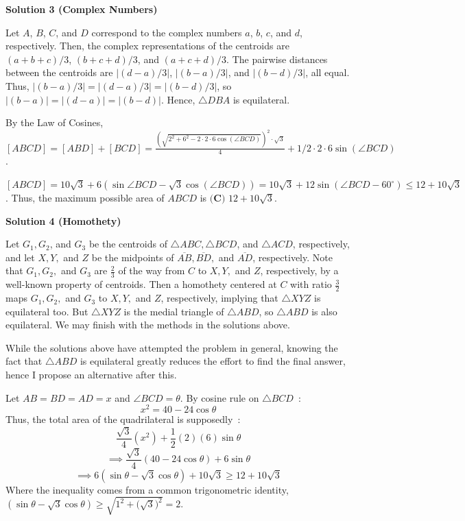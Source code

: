\begin{enumerate}
 



\textbf{Solution 3 (Complex Numbers)}

Let $A$, $B$, $C$, and $D$ correspond to the complex numbers $a$, $b$, $c$, and $d$, respectively. Then, the complex representations of the centroids are $(a+b+c)/3$, $(b+c+d)/3$, and $(a+c+d)/3$. The pairwise distances between the centroids are $\lvert (d-a)/3 \rvert$, $\lvert (b-a)/3 \rvert$, and $\lvert (b-d)/3 \rvert$, all equal. Thus, $\lvert (b-a)/3 \rvert=\lvert (d-a)/3 \rvert=\lvert (b-d)/3 \rvert$, so $\lvert (b-a) \rvert=\lvert (d-a) \rvert=\lvert (b-d) \rvert$. Hence, $\triangle DBA$ is equilateral.

 By the Law of Cosines,$[ABCD]=[ABD]+[BCD]=\frac{(\sqrt{2^2+6^2-2 \cdot 2 \cdot 6 \cos(\angle BCD)})^2 \cdot \sqrt{3}}{4}+1/2 \cdot 2 \cdot 6 \sin(\angle BCD)$.

 $[ABCD]=10\sqrt{3}+6(\sin{\angle BCD}-\sqrt{3}\cos(\angle BCD))= 10\sqrt{3}+12\sin(\angle BCD-60^{\circ}) \le 12 + 10\sqrt{3}$. Thus, the maximum possible area of $ABCD$ is $\boxed{\textbf{(C) }12 + 10\sqrt{3}}$.

 



\textbf{Solution 4 (Homothety)}

Let $G_1, G_2$, and $G_3$ be the centroids of $\triangle ABC, \triangle BCD$, and $\triangle ACD$, respectively, and let $X, Y,$ and $Z$ be the midpoints of $\overline{AB}, \overline{BD},$ and $\overline{AD}$, respectively. Note that $G_1, G_2,$ and $G_3$ are $\frac{2}{3}$ of the way from $C$ to $X, Y,$ and $Z$, respectively, by a well-known property of centroids. Then a homothety centered at $C$ with ratio $\frac{3}{2}$ maps $G_1, G_2,$ and $G_3$ to $X, Y,$ and $Z$, respectively, implying that $\triangle XYZ$ is equilateral too. But $\triangle XYZ$ is the medial triangle of $\triangle ABD$, so $\triangle ABD$ is also equilateral. We may finish with the methods in the solutions above.

 While the solutions above have attempted the problem in general, knowing the fact that $\triangle ABD$ is equilateral greatly reduces the effort to find the final answer, hence I propose an alternative after this.

 Let $AB = BD = AD = x$ and $\angle BCD = \theta$. By cosine rule on $\triangle BCD$ :
 \[x^2 = 40 - 24\cos \theta\]Thus, the total area of the quadrilateral is supposedly :
 \[\frac{\sqrt{3}}{4}(x^2) + \frac{1}{2}(2)(6)\sin \theta\]
 \[\implies \frac{\sqrt{3}}{4}(40 - 24\cos \theta) + 6\sin \theta\]
 \[\implies 6(\sin \theta - \sqrt{3}\cos \theta) + 10\sqrt{3} \geq 12 + 10\sqrt{3}\]Where the inequality comes from a common trigonometric identity, $(\sin \theta - \sqrt{3}\cos \theta) \geq \sqrt{1^2 + \big(\sqrt{3}\big)^2} = 2.$





\end{enumerate}
